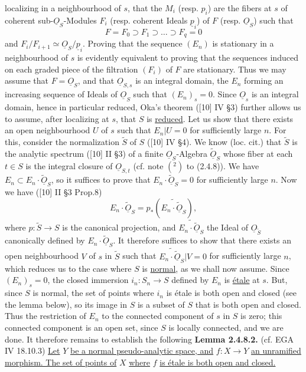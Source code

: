 %
localizing in a neighbourhood of $s$, that the $M_i$ (resp. $p_i$) are the fibers at $s$ of coherent sub-$\underline{O}_S$-Modules $F_i$ (resp. coherent Ideals $\underline{p}_i$) of $F$ (resp. $\underline{O}_S$) such that
\[
 F=F_0\supset F_1\supset\ldots\supset F_q=0
\]
and $F_i/F_{i+1}\simeq\underline{O}_S/\underline{p}_i$. Proving that the sequence $(E_n)$ is stationary in a neighbourhood of $s$ is evidently equivalent to proving that the sequences induced on each graded piece of the filtration $(F_i)$ of $F$ are stationary. Thus we may assume that $F=\underline{O}_S$, and that $\underline{O}_{S,s}$ is an integral domain, the $E_n$ forming an increasing sequence of Ideals of $\underline{O}_S$ such that $(E_n)_s=0$. Since $\underline{O}_s$ is an integral domain, hence in particular reduced, Oka's theorem ([10] IV \S3) further allows us to assume, after localizing at $s$, that $S$ is \uline{reduced}. Let us show that there exists an open neighbourhood $U$ of $s$ such that $E_n|U=0$ for sufficiently large $n$. For this, consider the normalization $\widetilde S$ of $S$ ([10] IV \S4). We know (loc. cit.) that $\widetilde S$ is the analytic spectrum ([10] II \S3) of a finite $\underline{O}_S$-Algebra $\widetilde{\underline{O}}_S$ whose fiber at each $t\in S$ is the integral closure of $\underline{O}_{S,t}$ (cf. note $(^2)$ to (2.4.8)). We have $E_n\subset E_n\cdot\widetilde{\underline{O}}_S$, so it suffices to prove that $E_n\cdot\widetilde{\underline{O}}_S=0$ for sufficiently large $n$. Now we have ([10] II \S3 Prop.8)
\[
 E_n\cdot\widetilde{\underline{O}}_S = p_*(\widetilde{E_n\cdot\widetilde{\underline{O}}_S}),
\]
where $p:\widetilde S\longrightarrow S$ is the canonical projection, and $\widetilde{E_n\cdot\widetilde{\underline{O}}_S}$ the Ideal of $\underline{O}_{\widetilde S}$ canonically defined by $E_n\cdot\widetilde{\underline{O}}_S$. It therefore suffices to show that there exists an open neighbourhood $V$ of $s$ in $\widetilde S$ such that $\widetilde{E_n\cdot\widetilde{\underline{O}}_S}|V=0$ for sufficiently large $n$, which reduces us to the case where $S$ is \uline{normal}, as we shall now assume. Since $(E_n)_s=0$, the closed immersion $i_n:S_n\longrightarrow S$ defined by $E_n$ is \uline{étale} at $s$. But, since $S$ is normal, the set of points where $i_n$ is étale is both open and closed (see the lemma below), so its image in $S$ is a subset of $S$ that is both open and closed. Thus the restriction of $E_n$ to the connected component of $s$ in $S$ is zero; this connected component is an open set, since $S$ is locally connected, and we are done. It therefore remains to establish the following
%
\textbf{Lemma 2.4.8.2.} (cf. EGA IV 18.10.3) \uline{Let} $Y$ \uline{be a normal pseudo-analytic space}\uline{, and} $f:X\longrightarrow Y$ \uline{an unramified morphism. The set of points of} $X$ \uline{where} $f$ \uline{is étale is both open and closed.}

